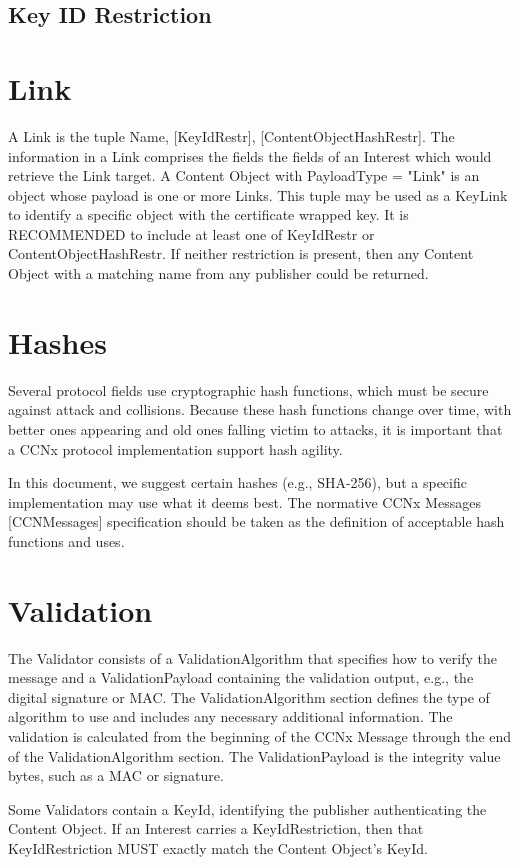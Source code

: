 \documentclass[12pt]{report}
\begin{document}
\subsection{Key ID Restriction}

\section{Link}
A Link is the tuple {Name, [KeyIdRestr], [ContentObjectHashRestr]}.
The information in a Link comprises the fields the fields of an
Interest which would retrieve the Link target.  A Content Object with
PayloadType = "Link" is an object whose payload is one or more Links.
This tuple may be used as a KeyLink to identify a specific object
with the certificate wrapped key.  It is RECOMMENDED to include at
least one of KeyIdRestr or ContentObjectHashRestr.  If neither
restriction is present, then any Content Object with a matching name
from any publisher could be returned.

\section{Hashes}
Several protocol fields use cryptographic hash functions, which must
be secure against attack and collisions.  Because these hash
functions change over time, with better ones appearing and old ones
falling victim to attacks, it is important that a CCNx protocol
implementation support hash agility.

In this document, we suggest certain hashes (e.g., SHA-256), but a
specific implementation may use what it deems best.  The normative
CCNx Messages [CCNMessages] specification should be taken as the
definition of acceptable hash functions and uses.

\section{Validation}
The Validator consists of a ValidationAlgorithm that specifies how to
verify the message and a ValidationPayload containing the validation
output, e.g., the digital signature or MAC.  The ValidationAlgorithm
section defines the type of algorithm to use and includes any
necessary additional information.  The validation is calculated from
the beginning of the CCNx Message through the end of the
ValidationAlgorithm section.  The ValidationPayload is the integrity
value bytes, such as a MAC or signature.

Some Validators contain a KeyId, identifying the publisher
authenticating the Content Object.  If an Interest carries a
KeyIdRestriction, then that KeyIdRestriction MUST exactly match the
Content Object's KeyId.
\end{document}
